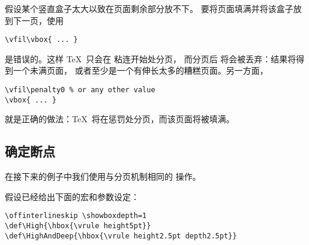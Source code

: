 \documentclass{book}
\begin{document}
假设某个竖直盒子太大以致在页面剩余部分放不下。
要将页面填满并将该盒子放到下一页，使用
\begin{verbatim}
\vfil\vbox{ ... }
\end{verbatim}
是错误的。这样 \TeX\ 只会在  粘连开始处分页，
而分页后  将会被丢弃：结果将得到一个未满页面，
或者至少是一个有伸长太多的糟糕页面。另一方面，
\begin{verbatim}
\vfil\penalty0 % or any other value
\vbox{ ... }
\end{verbatim}
就是正确的做法：\TeX\ 将在惩罚处分页，而该页面将被填满。

\subsection{确定断点}

在接下来的例子中我们使用与分页机制相同的  操作。

假设已经给出下面的宏和参数设定：
\begin{verbatim}
\offinterlineskip \showboxdepth=1
\def\High{\hbox{\vrule height5pt}}
\def\HighAndDeep{\hbox{\vrule height2.5pt depth2.5pt}}
\end{verbatim}
\end{document}
